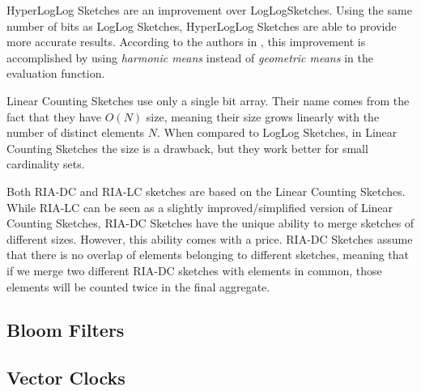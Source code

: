 HyperLogLog Sketches are an improvement over LogLogSketches. Using the same
number of bits as LogLog Sketches, HyperLogLog Sketches are able to provide more
accurate results. According to the authors in \cite{Fusy:2007um}, this
improvement is accomplished by using \emph{harmonic means} instead of
\emph{geometric means} in the evaluation function.

Linear Counting Sketches use only a single bit array. Their name comes from the
fact that they have $O(N)$ size, meaning their size grows linearly with the
number of distinct elements $N$. When compared to LogLog Sketches, in Linear
Counting Sketches the size is a drawback, but they work better for small
cardinality sets.

Both RIA-DC and RIA-LC sketches are based on the Linear Counting
Sketches. While RIA-LC can be seen as a slightly improved/simplified version of
Linear Counting Sketches, RIA-DC Sketches have the unique ability to
merge sketches of different sizes. However, this ability comes with a
price. RIA-DC Sketches assume that there is no overlap of elements belonging to
different sketches, meaning that if we merge two different RIA-DC sketches with
elements in common, those elements will be counted twice in the final aggregate.

\subsection{Bloom Filters}
\label{sec:bloom_filters}


\subsection{Vector Clocks}
\label{sec:vector_clocks}


